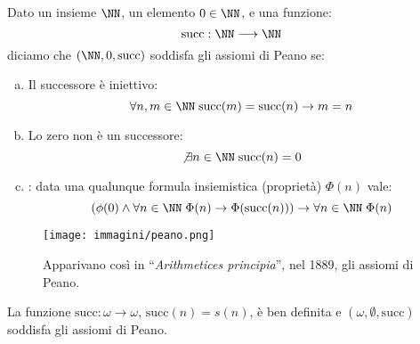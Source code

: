 \documentclass[11pt]{scrartcl}
\begin{document}
\begin{definition}
	Dato un insieme $\NN$, un elemento $0 \in \NN$, e una funzione:
	\[ \text{succ} : \NN \longrightarrow \NN
		\]
	diciamo che $(\NN,0,\text{succ})$ soddisfa gli assiomi di Peano se:
	\begin{enumerate}[(a)]
		\item \label{a}Il successore è iniettivo:
		\[ \forall n,m \in \NN \; \text{succ}(m) = \text{succ}(n) \rightarrow m = n
			\]
		\item \label{b}Lo zero non è un successore:
		\[ \not\exists n \in \NN \; \text{succ}(n) = 0
			\]
		\item {}: data una qualunque formula insiemistica (proprietà) $\Phi(n)$ vale:
		\[ (\phi(0) \land \forall n \in \NN \; \Phi(n) \rightarrow \Phi(\text{succ}(n))) \rightarrow \forall n \in \NN \; \Phi(n)
			\]
	\end{enumerate}
\end{definition}

\begin{center}
	\begin{figure*}[h]
		\centering
		\texttt{[image: immagini/peano.png]}
		\captionsetup{labelformat=empty}
		\caption{Apparivano così in ``\emph{Arithmetices principia}'', nel 1889, gli assiomi di Peano.}
	\end{figure*}
\end{center}

\begin{theorem}
	La funzione $\text{succ}: \omega \longrightarrow \omega$, $\text{succ}(n) = s(n)$, è ben definita e $(\omega,\emptyset,\text{succ})$
	soddisfa gli assiomi di Peano.
\end{theorem}
\end{document}
